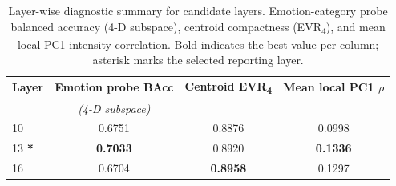 \begin{table}[H]
\centering
\small
\begin{tabular}{lccc}
\toprule
\textbf{Layer} &
  \textbf{Emotion probe BAcc} &
  \textbf{Centroid EVR\textsubscript{4}} &
  \textbf{Mean local PC1 $\rho$} \\
  & \textit{(4-D subspace)} & & \\
\midrule
  10 & 0.6751 & 0.8876 & 0.0998 \\
  13 \textbf{*} & \textbf{0.7033} & 0.8920 & \textbf{0.1336} \\
  16 & 0.6704 & \textbf{0.8958} & 0.1297 \\
\bottomrule
\end{tabular}
\caption{Layer-wise diagnostic summary for candidate layers. Emotion-category probe balanced
         accuracy (4-D subspace), centroid compactness (EVR\textsubscript{4}), and mean local
         PC1 intensity correlation. Bold indicates the best value per column; asterisk marks
         the selected reporting layer.}
\label{tab:layer_diagnostics}
\end{table}